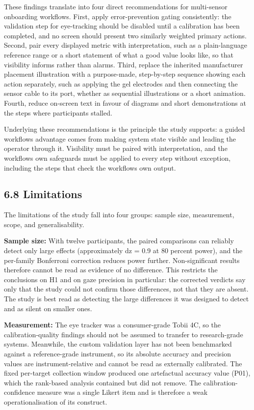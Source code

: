 \documentclass[
]{article}
\begin{document}
These findings translate into four direct recommendations for multi-sensor onboarding workflows. First, apply error-prevention gating consistently: the validation step for eye-tracking should be disabled until a calibration has been completed, and no screen should present two similarly weighted primary actions. Second, pair every displayed metric with interpretation, such as a plain-language reference range or a short statement of what a good value looks like, so that visibility informs rather than alarms. Third, replace the inherited manufacturer placement illustration with a purpose-made, step-by-step sequence showing each action separately, such as applying the gel electrodes and then connecting the sensor cable to its port, whether as sequential illustrations or a short animation. Fourth, reduce on-screen text in favour of diagrams and short demonstrations at the steps where participants stalled.

Underlying these recommendations is the principle the study supports: a guided workflow\textquotesingle s advantage comes from making system state visible and leading the operator through it. Visibility must be paired with interpretation, and the workflow\textquotesingle s own safeguards must be applied to every step without exception, including the steps that check the workflow\textquotesingle s own output.

\hypertarget{limitations}{%
\subsection{6.8 Limitations}\label{limitations}}

The limitations of the study fall into four groups: sample size, measurement, scope, and generalisability.

\textbf{Sample size:} With twelve participants, the paired comparisons can reliably detect only large effects (approximately dz = 0.9 at 80 percent power), and the per-family Bonferroni correction reduces power further. Non-significant results therefore cannot be read as evidence of no difference. This restricts the conclusions on H1 and on gaze precision in particular: the corrected verdicts say only that the study could not confirm those differences, not that they are absent. The study is best read as detecting the large differences it was designed to detect and as silent on smaller ones.

\textbf{Measurement:} The eye tracker was a consumer-grade Tobii 4C, so the calibration-quality findings should not be assumed to transfer to research-grade systems. Meanwhile, the custom validation layer has not been benchmarked against a reference-grade instrument, so its absolute accuracy and precision values are instrument-relative and cannot be read as externally calibrated. The fixed per-target collection window produced one artefactual accuracy value (P01), which the rank-based analysis contained but did not remove. The calibration-confidence measure was a single Likert item and is therefore a weak operationalisation of its construct.
\end{document}
